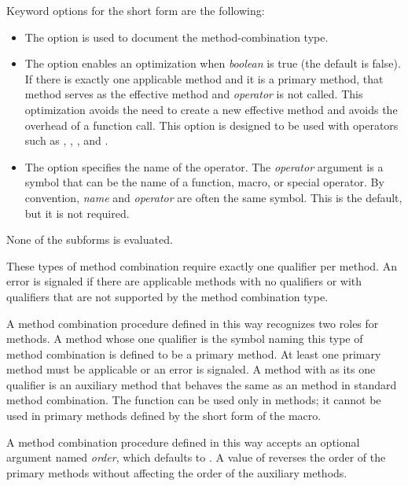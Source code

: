 \begin{defmac}
Keyword options for the short form are the following:

\begin{itemize}

\item 
The  option is used to document the method-combination type.

\item 
The  option enables an optimization
when \emph{boolean} is true (the default is false).  If there is
exactly one applicable method and it is a primary method, that method
serves as the effective method and \emph{operator} is not called.
This optimization avoids the need to create a new effective method and
avoids the overhead of a function call.  This option is designed to be
used with operators such as , , \cdf{+}, and
.

\item 
The  option specifies the name of the operator.  The
\emph{operator} argument is a symbol that can be the name of a
function, macro, or special operator.  By convention, \emph{name} and
\emph{operator} are often the same symbol.  This is the default,
but it is not required.
\end{itemize}

None of the subforms is evaluated.

These types of method combination require exactly one qualifier per
method.  An error is signaled if there are applicable methods with no
qualifiers or with qualifiers that are not supported by the method
combination type. 

A method combination procedure defined in this way recognizes two
roles for methods.  A method whose one qualifier is the symbol naming
this type of method combination is defined to be a primary method.  At
least one primary method must be applicable or an error is signaled.
A method with  as its one qualifier is an auxiliary
method that behaves the same as an  method in standard
method combination.  The function  can be
used only in  methods; it cannot be used in primary methods
defined by the short form of the  macro.

A method combination procedure defined in this way accepts an optional
argument named \emph{order}, which defaults to 
.  A value of  reverses
the order of the primary methods without affecting the order of the
auxiliary methods.


\end{defmac}
